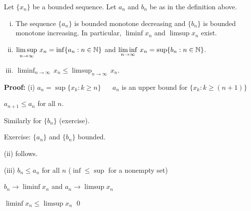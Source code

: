 \documentclass[10pt,aspectratio=149]{beamer}
\begin{document}
\begin{frame}

\begin{proposition}
Let $\{ x_n \}$ be a bounded sequence.  Let $a_n$ and $b_n$ be as in
the definition above.
\pause
\begin{enumerate}[(i)]
\item
The
sequence $\{ a_n \}$ is bounded monotone decreasing
and $\{ b_n \}$ is bounded monotone increasing.  In particular,
$\liminf x_n$ and $\limsup x_n$ exist.
\item\pause
$\displaystyle \limsup_{n \to \infty} \, x_n = \inf \{ a_n : n \in {\mathbb{N}} \}$
and
$\displaystyle \liminf_{n \to \infty} \, x_n = \sup \{ b_n : n \in {\mathbb{N}} \}$.
\item\pause
$\displaystyle \liminf_{n \to \infty} \, x_n \leq
\limsup_{n \to \infty} \, x_n$.
\end{enumerate}
\end{proposition}

\pause

\textbf{Proof:}
(i) $a_n = \sup \{ x_k : k \geq n \}$ ~\thus~ $a_n$ is an upper bound for
$\{ x_k : k \geq (n+1) \}$

\pause

\thus \quad $a_{n+1} \leq a_n$ for all $n$.

\pause

Similarly for $\{ b_n \}$ (exercise).

\pause
\medskip

Exercise: $\{a_n \}$ and $\{ b_n \}$ bounded.

\pause
\medskip

(ii) follows.

\pause
\medskip

(iii)
$b_n \leq a_n$ for all $n$ \quad ($\inf \leq \sup$ for a nonempty set)

\pause
$b_n \to \liminf x_n$ and $a_n \to \limsup x_n$

\pause
\thus \quad $\liminf x_n \leq \limsup x_n$ \qed

\end{frame}
\end{document}
